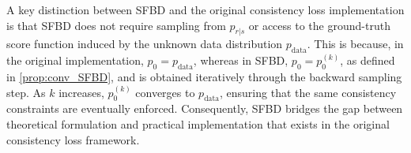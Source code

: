 A key distinction between SFBD and the original consistency loss implementation is that SFBD does not require sampling from $p_{r|s}$ or access to the ground-truth score function induced by the unknown data distribution $p_\text{data}$. This is because, in the original implementation, $p_0 = p_\text{data}$, whereas in SFBD,  $p_0 = p_0^{(k)}$, as defined in \cref{prop:conv_SFBD}, and is obtained iteratively through the backward sampling step. As $k$  increases,  $p_0^{(k)}$  converges to  $p_\text{data}$, ensuring that the same consistency constraints are eventually enforced. Consequently, SFBD bridges the gap between theoretical formulation and practical implementation that exists in the original consistency loss framework.





